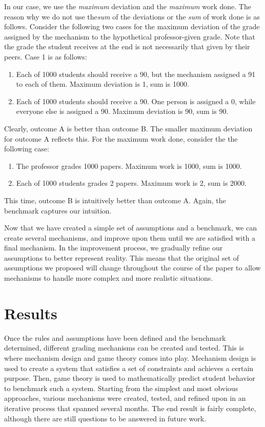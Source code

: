 \documentclass[12pt, Arial]{article}
\begin{document}
In our case, we use the \emph{maximum} deviation and the \emph{maximum} work done. The reason why we do not use the\emph{sum} of the deviations or the \emph{sum} of work done is as follows. Consider the following two cases for the maximum deviation of the grade assigned by the mechanism to the hypothetical professor-given grade. Note that the grade the student receives at the end is not necessarily that given by their peers. Case 1 is as follows:
\begin{enumerate}[label=\Alph*, itemsep=0pt, parsep=0pt]
	\item Each of 1000 students should receive a 90, but the mechanism assigned a 91 to each of them. Maximum deviation is 1, sum is 1000.
	\item Each of 1000 students should receive a 90. One person is assigned a 0, while everyone else is assigned a 90. Maximum deviation is 90, sum is 90.
\end{enumerate}
Clearly, outcome A is better than outcome B. The smaller maximum deviation for outcome A reflects this.
For the maximum work done, consider the the following case:
\begin{enumerate}[label=\Alph*, itemsep=0pt, parsep=0pt]
	\item The professor grades 1000 papers. Maximum work is 1000, sum is 1000.
	\item Each of 1000 students grades 2 papers. Maximum work is 2, sum is 2000.
\end{enumerate}
This time, outcome B is intuitively better than outcome A. Again, the benchmark captures our intuition.


Now that we have created a simple set of assumptions and a benchmark, we can create several mechanisms, and improve upon them until we are satisfied with a final mechanism. In the improvement process, we gradually refine our assumptions to better represent reality. This means that the original set of assumptions we proposed will change throughout the course of the paper to allow mechanisms to handle more complex and more realistic situations.

\section{Results}
Once the rules and assumptions have been defined and the benchmark determined, different grading mechanisms can be created and tested. This is where mechanism design and game theory comes into play. Mechanism design is used to create a system that satisfies a set of constraints and achieves a certain purpose. Then, game theory is used to mathematically predict student behavior to benchmark such a system. Starting from the simplest and most obvious approaches, various mechanisms were created, tested, and refined upon in an iterative process that spanned several months. The end result is fairly complete, although there are still questions to be answered in future work.
\end{document}

